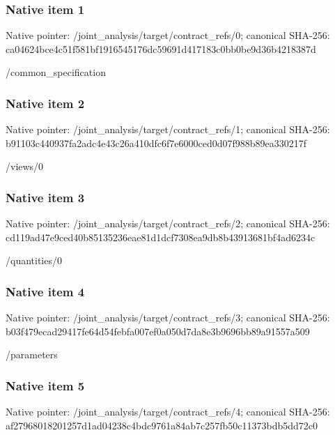 \documentclass[10pt,a4paper]{article}
\begin{document}
\subsubsection{Native item 1}
Native pointer: /joint\_\allowbreak{}analysis/target/contract\_\allowbreak{}refs/0; canonical SHA-256: ca04624bce4c51f581bf1916545176dc59691d417183c0bb0be9d36b4218387d

\begingroup\raggedright\sloppy /\allowbreak{}common\_\allowbreak{}specification\par\endgroup

\subsubsection{Native item 2}
Native pointer: /joint\_\allowbreak{}analysis/target/contract\_\allowbreak{}refs/1; canonical SHA-256: b91103c440937fa2adc4e43c26a410dfc6f7e6000ced0d07f988b89ea330217f

\begingroup\raggedright\sloppy /\allowbreak{}views/\allowbreak{}0\par\endgroup

\subsubsection{Native item 3}
Native pointer: /joint\_\allowbreak{}analysis/target/contract\_\allowbreak{}refs/2; canonical SHA-256: cd119ad47e9ced40b85135236eae81d1dcf7308ea9db8b43913681bf4ad6234c

\begingroup\raggedright\sloppy /\allowbreak{}quantities/\allowbreak{}0\par\endgroup

\subsubsection{Native item 4}
Native pointer: /joint\_\allowbreak{}analysis/target/contract\_\allowbreak{}refs/3; canonical SHA-256: b03f479ecad29417fe64d54febfa007ef0a050d7da8e3b9696bb89a91557a509

\begingroup\raggedright\sloppy /\allowbreak{}parameters\par\endgroup

\subsubsection{Native item 5}
Native pointer: /joint\_\allowbreak{}analysis/target/contract\_\allowbreak{}refs/4; canonical SHA-256: af27968018201257d1ad04238c4bdc9761a84ab7c257fb50c11373bdb5dd72c0
\end{document}
